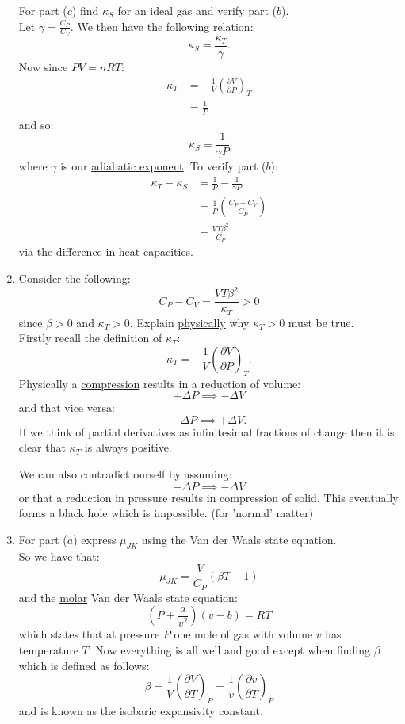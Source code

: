 \begin{enumerate}
    For part ($c$) find $\kappa_S$ for an ideal gas
    and verify part ($b$). \\

    Let $\gamma=\displaystyle\frac{C_P}{C_V}$.
    We then have the following relation:
    $$\kappa_S=\frac{\kappa_T}{\gamma}.$$
    Now since $PV=nRT$:
    \begin{align*}
        \kappa_T
        &=-\frac{1}{V}
        \left(\frac{\partial V}{\partial P}\right)_T \\
        &=\frac{1}{P}
    \end{align*}
    and so:
    $$\kappa_S=\frac{1}{\gamma P}$$
    where $\gamma$ is our \underline{adiabatic exponent}. To verify part ($b$):
    \begin{align*}
        \kappa_T-\kappa_S
        &=\frac{1}{P}-\frac{1}{\gamma P} \\
        &=\frac{1}{P}\left(\frac{C_P-C_V}{C_P}\right) \\
        &=\frac{VT\beta^2}{C_P}
    \end{align*}
    via the difference in heat capacities.

    \newpage

    \item Consider the following:
    $$C_P-C_V=\frac{VT\beta^2}{\kappa_T}>0$$
    since $\beta>0$ and $\kappa_T>0$. Explain \underline{physically}
    why $\kappa_T>0$ must be true. \\

    Firstly recall the definition of $\kappa_T$:
    $$\kappa_T=-\frac{1}{V}
    \left(\frac{\partial V}{\partial P}\right)_T.$$
    Physically a \underline{compression} results in a reduction of volume:
    $$+\Delta P\implies-\Delta V$$
    and that vice versa:
    $$-\Delta P\implies+\Delta V.$$
    If we think of partial derivatives as infinitesimal fractions
    of change then it is clear that $\kappa_T$ is always positive.

    We can also contradict ourself by assuming:
    $$-\Delta P\implies-\Delta V$$
    or that a reduction in pressure results in compression
    of solid. This eventually forms a black hole which is impossible.
    (for 'normal' matter)

    \newpage

    \item For part ($a$) express $\mu_{JK}$
    using the Van der Waals state equation. \\

    So we have that:
    $$\mu_{JK}=\frac{V}{C_P}(\beta T-1)$$
    and the \underline{molar} Van der Waals state equation:
    $$\left(P+\frac{a}{v^2}\right)(v-b)=RT$$
    which states that at pressure $P$
    one mole of gas with volume $v$
    has temperature $T$.
    Now everything is all well and good except when finding
    $\beta$ which is defined as follows:
    $$\beta=\frac{1}{V}
    \left(\frac{\partial V}{\partial T}\right)_P
    =\frac{1}{v}
    \left(\frac{\partial v}{\partial T}\right)_P$$
    and is known as the isobaric expansivity constant.


\end{enumerate}
